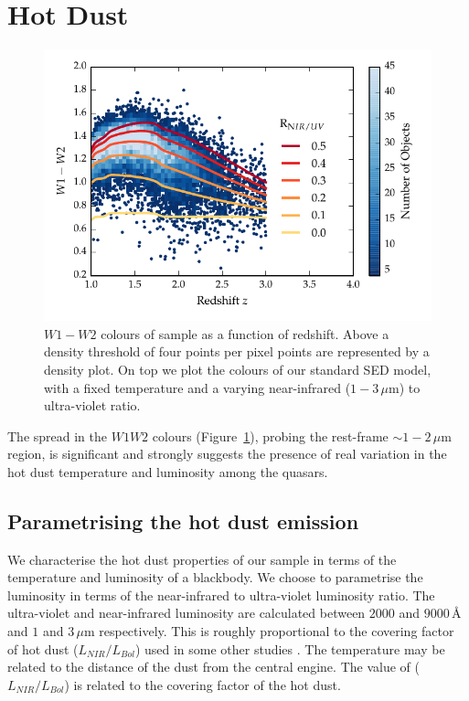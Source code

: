 \section{Hot Dust}
\label{sec:ch5-hotdust}

\begin{figure}[h!]
\centering
\includegraphics[width=\columnwidth]{figures/chapter05/w1w2_versus_redshift_ratio.pdf}
\caption[{$W1 - W2$ colours of sample as a function of redshift.}]{$W1 - W2$ colours of sample as a function of redshift. Above a density threshold of four points per pixel points are represented by a density plot. On top we plot the colours of our standard SED model, with a fixed temperature and a varying near-infrared ($1 - 3$\,$\mu$m) to ultra-violet ratio.}
  \label{fig:w1w2colorsratio}
\end{figure}

The spread in the $W1W2$ colours (Figure~\ref{fig:w1w2colorsratio}), probing the rest-frame $\sim1-2$\,$\mu$m region, is significant and strongly suggests the presence of real variation in the hot dust temperature and luminosity among the quasars. 

\subsection{Parametrising the hot dust emission}

We characterise the hot dust properties of our sample in terms of the temperature and luminosity of a blackbody.  
We choose to parametrise the luminosity in terms of the near-infrared to ultra-violet luminosity ratio. 
The ultra-violet and near-infrared luminosity are calculated between $2000$ and $9000$\,\AA\, and $1$ and $3$\,$\mu$m respectively.
This is roughly proportional to the covering factor of hot dust ($L_{NIR}/L_{Bol}$) used in some other studies \citep[e.g.][]{roseboom13}. 
The temperature may be related to the distance of the dust from the central engine. 
The value of ($L_{NIR}/L_{Bol}$) is related to the covering factor of the hot dust. 

